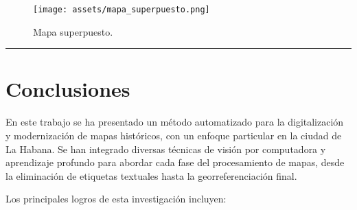 \documentclass[twocolumn, fontsize=10pt]{article}
\begin{document}
\begin{figure}[H]
    \centering
    \texttt{[image: assets/mapa\_superpuesto.png]}
    \caption{Mapa superpuesto.}
    \label{fig:poligonos_atipicos}
\end{figure}

\rule{\linewidth}{0.5pt}
\section{Conclusiones}

En este trabajo se ha presentado un m\'etodo automatizado para la digitalizaci\'on y modernizaci\'on de mapas hist\'oricos, con un enfoque particular en la ciudad de La Habana. Se han integrado diversas t\'ecnicas de visi\'on por computadora y aprendizaje profundo para abordar cada fase del procesamiento de mapas, desde la eliminaci\'on de etiquetas textuales hasta la georreferenciaci\'on final.

Los principales logros de esta investigaci\'on incluyen:
\end{document}
